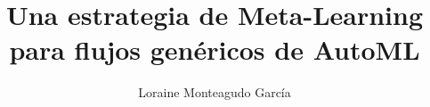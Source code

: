 \documentclass[10pt,oneside]{uhthesis}
\title{Una estrategia de Meta-Learning para flujos genéricos de AutoML}
\author{Loraine Monteagudo García}
\date{}
\begin{document}
\renewcommand{\arraystretch}{1.5}


\frontmatter
\maketitle

%






\mainmatter






\backmatter




%
\end{document}
